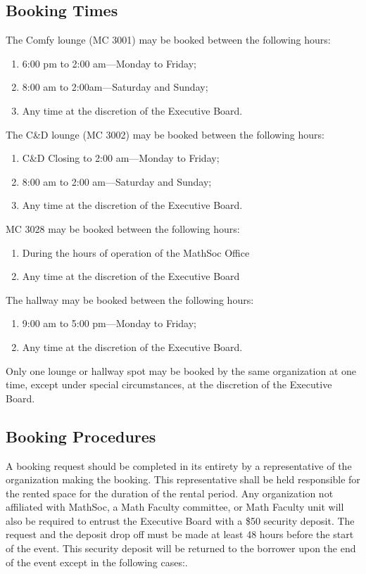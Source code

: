 \subsection{Booking Times}

\noindent The Comfy lounge (MC 3001) may be booked between the following hours:
\begin{enumerate}
	\item 6:00 pm to 2:00 am---Monday to Friday;
	\item 8:00 am to 2:00am---Saturday and Sunday;
	\item Any time at the discretion of the Executive Board.
\end{enumerate}

\noindent The C\&D lounge (MC 3002) may be booked between the following hours:
\begin{enumerate}
	\item C\&D Closing to 2:00 am---Monday to Friday;
	\item 8:00 am to 2:00 am---Saturday and Sunday;
	\item Any time at the discretion of the Executive Board.
\end{enumerate}

\noindent MC 3028 may be booked between the following hours:
\begin{enumerate}
	\item During the hours of operation of the MathSoc Office
	\item Any time at the discretion of the Executive Board
\end{enumerate}

\noindent The hallway may be booked between the following hours:
\begin{enumerate}
	\item 9:00 am to 5:00 pm---Monday to Friday;
	\item Any time at the discretion of the Executive Board.
\end{enumerate}

\noindent Only one lounge or hallway spot may be booked by the same organization at one
time, except under special circumstances, at the discretion of the Executive
Board.

\subsection{Booking Procedures}

A booking request should be completed in its entirety by a representative of the organization
making the booking. This representative shall be held responsible for the rented space for the
duration of the rental period. Any organization not affiliated with MathSoc, a Math Faculty committee, or Math Faculty unit will also be required
to entrust the Executive Board with a \$50 security deposit. The request and the deposit drop off
must be made at least 48 hours before the start of the event. This security deposit will be
returned to the borrower upon the end of the event except in the following cases:.

